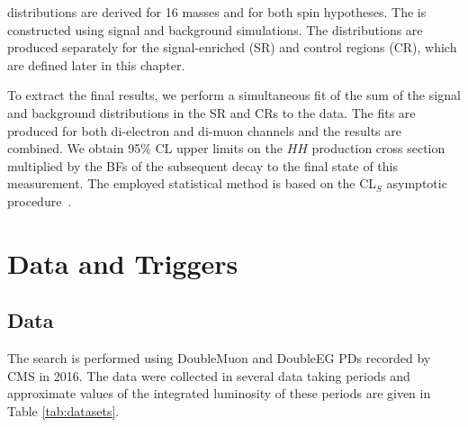 \mTHH distributions are derived for 16 masses and for both spin hypotheses. The \mTHH is constructed using signal and background simulations. The distributions are produced separately for the signal-enriched (SR) and control regions (CR), which are defined later in this chapter.

To extract the final results, we perform a simultaneous fit of the sum of the signal and background \mTHH distributions in the SR and CRs to the data. The fits are produced for both di-electron and di-muon channels and the results are combined. We obtain 95\% CL upper limits on the $HH$ production cross section multiplied by the BFs of the subsequent decay to the final state of this measurement. The employed statistical method is based on the CL$_{S}$ asymptotic procedure~\cite{Zech:1988un}.

\section{Data and Triggers}
\label{sec:data_and_triggers}

\subsection{Data}
The search is performed using DoubleMuon and DoubleEG PDs recorded by CMS in 2016.
The data were collected in several data taking periods and approximate values of the integrated luminosity of these periods are given in Table \ref{tab:datasets}.

